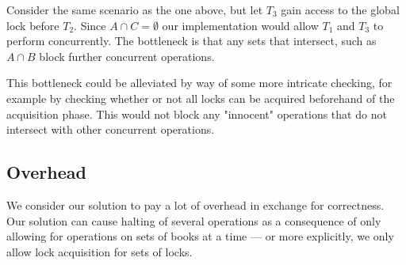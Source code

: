 Consider the same scenario as the one above, but let $T_3$ gain access to the
global lock before $T_2$. Since $A \cap C = \emptyset$ our implementation would
allow $T_1$ and $T_3$ to perform concurrently. The bottleneck is that any sets
that intersect, such as $A \cap B$ block further concurrent operations.

This bottleneck could be alleviated by way of some more intricate checking, for
example by checking whether or not all locks can be acquired beforehand of the
acquisition phase. This would not block any "innocent" operations that do not
intersect with other concurrent operations.

\subsection{Overhead}
We consider our solution to pay a lot of overhead in exchange for correctness.
Our solution can cause halting of several operations as a consequence of only
allowing for operations on sets of books at a time --- or more explicitly, we
only allow lock acquisition for sets of locks.
